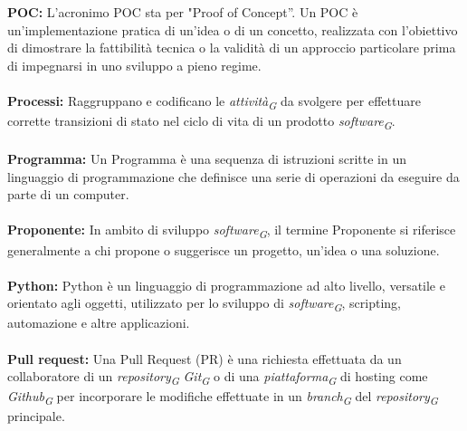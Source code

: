 \documentclass{article}
\begin{document}
\\
\\
\textbf{POC:} L'acronimo POC sta per "Proof of Concept”. Un POC è un'implementazione pratica di un'idea o di un concetto, realizzata con l'obiettivo di dimostrare la fattibilità tecnica o la validità di un approccio particolare prima di impegnarsi in uno sviluppo a pieno regime.
\\
\\
\textbf{Processi:} Raggruppano e codificano le \textit{attività}\textsubscript{\textit{G}} da svolgere per effettuare corrette transizioni di stato nel ciclo di vita di un prodotto \textit{software}\textsubscript{\textit{G}}.
\\
\\
\textbf{Programma:} Un Programma è una sequenza di istruzioni scritte in un linguaggio di programmazione che definisce una serie di operazioni da eseguire da parte di un computer.
\\
\\
\textbf{Proponente:} In ambito di sviluppo \textit{software}\textsubscript{\textit{G}}, il termine Proponente si riferisce generalmente a chi propone o suggerisce un progetto, un'idea o una soluzione.
\\
\\
\textbf{Python:} Python è un linguaggio di programmazione ad alto livello, versatile e orientato agli oggetti, utilizzato per lo sviluppo di \textit{software}\textsubscript{\textit{G}}, scripting, automazione e altre applicazioni.
\\
\\
\textbf{Pull request:} Una Pull Request (PR) è una richiesta effettuata da un collaboratore di un \textit{repository}\textsubscript{\textit{G}} \textit{Git}\textsubscript{\textit{G}} o di una \textit{piattaforma}\textsubscript{\textit{G}} di hosting come \textit{Github}\textsubscript{\textit{G}} per incorporare le modifiche effettuate in un \textit{branch}\textsubscript{\textit{G}} del \textit{repository}\textsubscript{\textit{G}} principale.
\pagebreak
\end{document}
